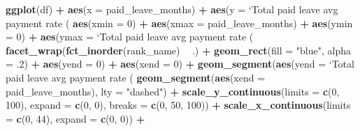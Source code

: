 \documentclass[]{book}
\newenvironment{Shaded}{\begin{snugshade}}{\end{snugshade}}
\newcommand{\KeywordTok}[1]{\textcolor[rgb]{0.13,0.29,0.53}{\textbf{#1}}}
\newcommand{\DataTypeTok}[1]{\textcolor[rgb]{0.13,0.29,0.53}{#1}}
\newcommand{\DecValTok}[1]{\textcolor[rgb]{0.00,0.00,0.81}{#1}}
\newcommand{\StringTok}[1]{\textcolor[rgb]{0.31,0.60,0.02}{#1}}
\newcommand{\OperatorTok}[1]{\textcolor[rgb]{0.81,0.36,0.00}{\textbf{#1}}}
\newcommand{\NormalTok}[1]{#1}
\theoremstyle{definition}
\theoremstyle{definition}
\theoremstyle{definition}
\theoremstyle{remark}
\begin{document}
\begin{Shaded}
\begin{Highlighting}[]
\KeywordTok{ggplot}\NormalTok{(df) }\OperatorTok{+}
\StringTok{  }\KeywordTok{aes}\NormalTok{(}\DataTypeTok{x =}\NormalTok{ paid_leave_months) }\OperatorTok{+}
\StringTok{  }\KeywordTok{aes}\NormalTok{(}\DataTypeTok{y =} \StringTok{`}\DataTypeTok{Total paid leave avg payment rate (%)}\StringTok{`}\NormalTok{) }\OperatorTok{+}
\StringTok{  }\KeywordTok{aes}\NormalTok{(}\DataTypeTok{xmin =} \DecValTok{0}\NormalTok{) }\OperatorTok{+}
\StringTok{  }\KeywordTok{aes}\NormalTok{(}\DataTypeTok{xmax =}\NormalTok{ paid_leave_months) }\OperatorTok{+}
\StringTok{  }\KeywordTok{aes}\NormalTok{(}\DataTypeTok{ymin =} \DecValTok{0}\NormalTok{) }\OperatorTok{+}
\StringTok{  }\KeywordTok{aes}\NormalTok{(}\DataTypeTok{ymax =} \StringTok{`}\DataTypeTok{Total paid leave avg payment rate (%)}\StringTok{`}\NormalTok{) }\OperatorTok{+}
\StringTok{  }\KeywordTok{facet_wrap}\NormalTok{(}\KeywordTok{fct_inorder}\NormalTok{(rank_name) }\OperatorTok{~}\StringTok{ }\NormalTok{.) }\OperatorTok{+}
\StringTok{  }\KeywordTok{geom_rect}\NormalTok{(}\DataTypeTok{fill =} \StringTok{"blue"}\NormalTok{, }\DataTypeTok{alpha =}\NormalTok{ .}\DecValTok{2}\NormalTok{) }\OperatorTok{+}
\StringTok{  }\KeywordTok{aes}\NormalTok{(}\DataTypeTok{yend =} \DecValTok{0}\NormalTok{) }\OperatorTok{+}
\StringTok{  }\KeywordTok{aes}\NormalTok{(}\DataTypeTok{xend =} \DecValTok{0}\NormalTok{) }\OperatorTok{+}
\StringTok{  }\KeywordTok{geom_segment}\NormalTok{(}\KeywordTok{aes}\NormalTok{(}\DataTypeTok{yend =} \StringTok{`}\DataTypeTok{Total paid leave avg payment rate (%)}\StringTok{`}\NormalTok{), }\DataTypeTok{lty =} \StringTok{"dashed"}\NormalTok{) }\OperatorTok{+}
\StringTok{  }\KeywordTok{geom_segment}\NormalTok{(}\KeywordTok{aes}\NormalTok{(}\DataTypeTok{xend =}\NormalTok{ paid_leave_months), }\DataTypeTok{lty =} \StringTok{"dashed"}\NormalTok{) }\OperatorTok{+}
\StringTok{  }\KeywordTok{scale_y_continuous}\NormalTok{(}\DataTypeTok{limits =} \KeywordTok{c}\NormalTok{(}\DecValTok{0}\NormalTok{, }\DecValTok{100}\NormalTok{), }\DataTypeTok{expand =} \KeywordTok{c}\NormalTok{(}\DecValTok{0}\NormalTok{, }\DecValTok{0}\NormalTok{), }\DataTypeTok{breaks =} \KeywordTok{c}\NormalTok{(}\DecValTok{0}\NormalTok{, }\DecValTok{50}\NormalTok{, }\DecValTok{100}\NormalTok{)) }\OperatorTok{+}
\StringTok{  }\KeywordTok{scale_x_continuous}\NormalTok{(}\DataTypeTok{limits =} \KeywordTok{c}\NormalTok{(}\DecValTok{0}\NormalTok{, }\DecValTok{44}\NormalTok{), }\DataTypeTok{expand =} \KeywordTok{c}\NormalTok{(}\DecValTok{0}\NormalTok{, }\DecValTok{0}\NormalTok{)) }\OperatorTok{+}
}}}
\end{Highlighting}
\end{Shaded}
\end{document}
